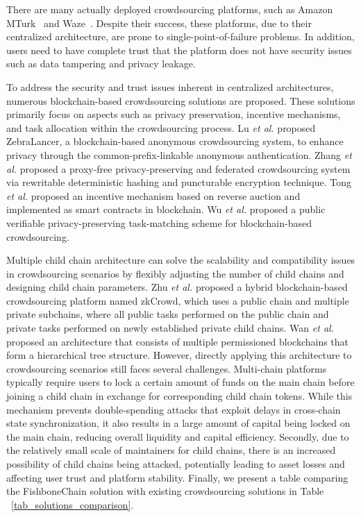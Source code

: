 \documentclass[10pt,journal]{IEEEtran}
\begin{document}
There are many actually deployed crowdsourcing platforms, such as Amazon MTurk~\cite{MechanicalTurk} and Waze~\cite{Waze}. Despite their success, these platforms, due to their centralized architecture, are prone to single-point-of-failure problems. In addition, users need to have complete trust that the platform does not have security issues such as data tampering and privacy leakage.

To address the security and trust issues inherent in centralized architectures, numerous blockchain-based crowdsourcing solutions are proposed. These solutions primarily focus on aspects such as privacy preservation\cite{lu2018zebralancer,zhang2021enabling}, incentive mechanisms\cite{tong2024privacy}, and task allocation\cite{wu2024vp} within the crowdsourcing process. Lu \textit{et al.} \cite{lu2018zebralancer} proposed ZebraLancer, a blockchain-based anonymous crowdsourcing system, to enhance privacy through the common-prefix-linkable anonymous authentication. Zhang \textit{et al.} \cite{zhang2021enabling} proposed a proxy-free privacy-preserving and federated crowdsourcing system via rewritable deterministic hashing and puncturable encryption technique. Tong \textit{et al.} \cite{tong2024privacy} proposed an incentive mechanism based on reverse auction and implemented as smart contracts in blockchain. Wu \textit{et al.} \cite{wu2024vp} proposed a public verifiable privacy-preserving task-matching scheme for blockchain-based crowdsourcing.

Multiple child chain architecture can solve the scalability and compatibility issues in crowdsourcing scenarios by flexibly adjusting the number of child chains and designing child chain parameters. Zhu \textit{et al.} \cite{zhu2019zkcrowd} proposed a hybrid blockchain-based crowdsourcing platform named zkCrowd, which uses a public chain and multiple private subchains, where all public tasks performed on the public chain and private tasks performed on newly established private child chains. Wan \textit{et al.} \cite{wan2022hibechain} proposed an architecture that consists of multiple permissioned blockchains that form a hierarchical tree structure. However, directly applying this architecture to crowdsourcing scenarios still faces several challenges. Multi-chain platforms typically require users to lock a certain amount of funds on the main chain before joining a child chain in exchange for corresponding child chain tokens. While this mechanism prevents double-spending attacks that exploit delays in cross-chain state synchronization, it also results in a large amount of capital being locked on the main chain, reducing overall liquidity and capital efficiency. Secondly, due to the relatively small scale of maintainers for child chains, there is an increased possibility of child chains being attacked, potentially leading to asset losses and affecting user trust and platform stability. Finally, we present a table comparing the FishboneChain solution with existing crowdsourcing solutions in Table ~\ref{tab_solutions_comparison}.
\end{document}
